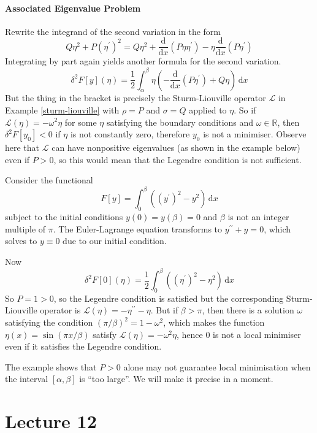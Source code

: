 \documentclass[a4paper]{article}
\begin{document}
\subsection{Associated Eigenvalue Problem}
Rewrite the integrand of the second variation in the form
$$Q\eta^2+P(\eta^\prime)^2=Q\eta^2+\frac{\mathrm d}{\mathrm dx}(P\eta\eta^\prime)-\eta\frac{\mathrm d}{\mathrm dx}(P\eta^\prime)$$
Integrating by part again yields another formula for the second variation.
$$\delta^2F[y](\eta)=\frac{1}{2}\int_\alpha^\beta\eta\left( -\frac{\mathrm d}{\mathrm dx}(P\eta^\prime)+ Q\eta\right)\,\mathrm dx$$
But the thing in the bracket is precisely the Sturm-Liouville operator $\mathcal L$ in Example \ref{sturm-liouville} with $\rho=P$ and $\sigma=Q$ applied to $\eta$.
So if $\mathcal L(\eta)=-\omega^2\eta$ for some $\eta$ satisfying the boundary conditions and $\omega\in\mathbb R$, then $\delta^2F[y_0]<0$ if $\eta$ is not constantly zero, therefore $y_0$ is not a minimiser.
Observe here that $\mathcal L$ can have nonpositive eigenvalues (as shown in the example below) even if $P>0$, so this would mean that the Legendre condition is not sufficient.
\begin{example}
    Consider the functional
    $$F[y]=\int_0^\beta((y^\prime)^2-y^2)\,\mathrm dx$$
    subject to the initial conditions $y(0)=y(\beta)=0$ and $\beta$ is not an integer multiple of $\pi$.
    The Euler-Lagrange equation transforms to $y^{\prime\prime}+y=0$, which solves to $y\equiv 0$ due to our initial condition.

    Now
    $$\delta^2F[0](\eta)=\frac{1}{2}\int_0^\beta((\eta^\prime)^2-\eta^2)\,\mathrm dx$$
    So $P=1>0$, so the Legendre condition is satisfied but the corresponding Sturm-Liouville operator is $\mathcal L(\eta)=-\eta^{\prime\prime}-\eta$.
    But if $\beta>\pi$, then there is a solution $\omega$ satisfying the condition $(\pi/\beta)^2=1-\omega^2$, which makes the function $\eta(x)=\sin(\pi x/\beta)$ satisfy $\mathcal L(\eta)=-\omega^2\eta$, hence $0$ is not a local minimiser even if it satisfies the Legendre condition.
\end{example}
The example shows that $P>0$ alone may not guarantee local minimisation when the interval $[\alpha,\beta]$ is ``too large''.
We will make it precise in a moment.
\newpage
\part*{Lecture 12}
\end{document}
